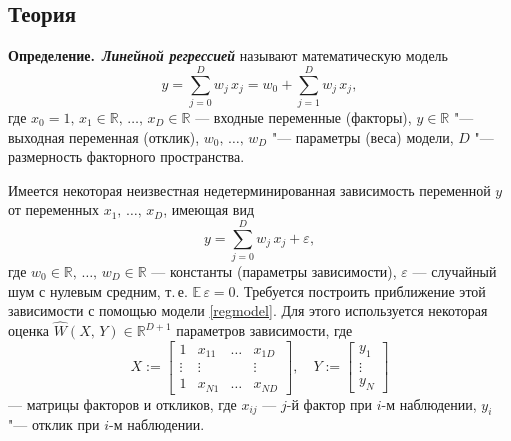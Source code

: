 \documentclass[12pt,a4paper]{article}
\newcommand{\reals}{\mathbb{R}}
\newcommand{\expectation}{\mathbb{E}}
\newcommand{\bi}[1]{\textbf{\textit{#1}}}
\newcommand{\definition}{\textbf{Определение.}}
\begin{document}
	\newpage
	\begin{center}
		\section{Теория}
	\end{center}
	
	\definition\ \bi{Линейной регрессией} называют математическую модель
	\begin{equation}
		\label{regmodel}
		y = \sum_{j=0}^{D} w_j \, x_j = w_0 + \sum_{j=1}^{D} w_j \, x_j,
	\end{equation}
	где $x_0 = 1, \, x_1 \in \reals, \, \ldots, \, x_D \in \reals$ --- входные переменные (факторы), $y \in \reals$ "--- выходная переменная (отклик), $w_0, \, \ldots, \, w_D$ "--- параметры (веса) модели, $D$ "--- размерность факторного пространства.
	
	Имеется некоторая неизвестная недетерминированная зависимость переменной $y$ от переменных $x_1, \, \ldots, \, x_D$, имеющая вид
	\begin{equation}
		\label{relation}
		y = \sum_{j=0}^{D} w_j \, x_j + \varepsilon,
	\end{equation}
	где $w_0 \in \reals, \, \ldots, \, w_D \in \reals$ --- константы (параметры зависимости), $\varepsilon$ --- случайный шум с нулевым средним, т.\,е. $\expectation \, \varepsilon = 0$. Требуется построить приближение этой зависимости с помощью модели \eqref{regmodel}. Для этого используется некоторая оценка $\widehat{W}(X,\,Y) \in \reals^{D+1}$ параметров зависимости, где
	\begin{equation}
		\label{sample}
		X := \begin{bmatrix}
			1      & x_{11} & \ldots & x_{1D} \\
			\vdots & \vdots &        & \vdots \\
			1      & x_{N1} & \ldots & x_{ND}
		\end{bmatrix}\!,
		\quad
		Y := \begin{bmatrix}
			y_1 \\ \vdots \\ y_N
		\end{bmatrix}
	\end{equation}
	--- матрицы факторов и откликов, где $x_{ij}$ --- $j$-й фактор при $i$-м наблюдении, $y_i$ "--- отклик при $i$-м наблюдении.
	
	
\end{document}
